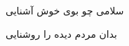 \documentclass{letter}
\begin{document}
سلامی چو بوی خوش آشنایی

بدان مردم دیده را روشنایی
\end{document}
